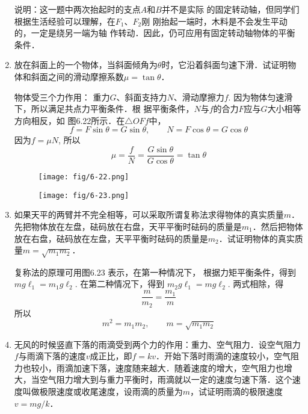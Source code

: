 \begin{enumerate}
\begin{solution}
说明：这一题中两次抬起时的支点$A$和$B$并不是实际
的固定转动轴，但同学们根据生活经验可以理解，在$F_1$、$F_2$刚
刚抬起一端时，木料是不会发生平动的，一定是绕另一端为轴
作转动．因此，仍可应用有固定转动轴物体的平衡条件．

\end{solution}
\item 放在斜面上的一个物体，当斜面倾角为$\theta$时，它沿着斜面匀速下滑．试证明物体和斜面之间的滑动摩擦系数$\mu=\tan \theta$．

\begin{solution}
物体受三个力作用：
重力$G$、斜面支持力$N$、滑动摩擦力$f$. 因为物体匀速滑下，所以满足共点力平衡条件．根
据平衡条件，$N$与$f$的合力$F$应与$G$大小相等方向相反，如
图6.22所示．在$\triangle OFf$中，
\[f=F\sin\theta =G\sin \theta,\qquad N=F\cos\theta=G\cos\theta\]
因为$f=\mu N$, 所以
\[\mu =\frac{f}{N}=\frac{G\sin \theta}{G\cos \theta}=\tan\theta\]
\end{solution}

\begin{figure}[htp]\centering
    \begin{minipage}[t]{0.48\textwidth}
    \centering
\texttt{[image: fig/6-22.png]}
    \caption{}
    \end{minipage}
    \begin{minipage}[t]{0.48\textwidth}
    \centering
\texttt{[image: fig/6-23.png]}
    \caption{}
    \end{minipage}
    \end{figure}

\item 如果天平的两臂并不完全相等，可以采取所谓复称法求得物体的真实质量$m$．先把物体放在左盘，砝码放在右盘，天平平衡时砝码的质量是$m_1$．然后把物体放在右盘，砝码放在左盘，天平平衡时砝码的质量是$m_2$．试证明物体的真实质量$m=\sqrt{m_1m_2}$．

\begin{solution}
    复称法的原理可用图6.23 表示，在第一种情况下，
    根据力矩平衡条件，得到$mg\ell_1=m_1g\ell_2$. 在第二种情况下，得到 $m_2g\ell_1=mg\ell_2$. 两式相除，得
\[\frac{m}{m_2}=\frac{m_1}{m}\]
所以
\[m^2=m_1m_2,\qquad m=\sqrt{m_1m_2}\]
\end{solution}
\item 无风的时候竖直下落的雨滴受到两个力的作用：重力、空气阻力．设空气阻力$f$与雨滴下落的速度$v$成正比，即$f=kv$．开始下落时雨滴的速度较小，空气阻力也较小，雨滴加速下落，速度随来越大．随着速度的增大，空气阻力也增大，当空气阻力增大到与重力平衡时，雨滴就以一定的速度匀速下落．这个速度叫做极限速度或收尾速度，设雨滴的质量为$m$，试证明雨滴的极限速度$v=mg/k$．



\end{enumerate}
